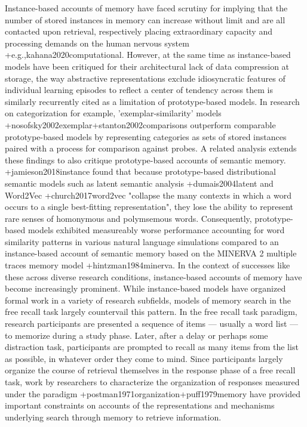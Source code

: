 {}Instance-based accounts of memory have faced scrutiny for implying that the number of stored instances in memory can increase without limit and are all contacted upon retrieval, respectively placing extraordinary capacity and processing demands on the human nervous system +{e.g.,}{}{kahana2020computational}. However, at the same time as instance-based models have been critiqued for their architectural lack of data compression at storage, the way abstractive representations exclude idiosyncratic features of individual learning episodes to reflect a center of tendency across them is similarly recurrently cited as a limitation of prototype-based models. In research on categorization for example, 'exemplar-similarity' models +{}{}{nosofsky2002exemplar}+{}{}{stanton2002comparisons} outperform comparable prototype-based models by representing categories as sets of stored instances paired with a process for comparison against probes. A related analysis extends these findings to also critique prototype-based accounts of semantic memory. +{}{}{jamieson2018instance} found that because prototype-based distributional semantic models such as latent semantic analysis +{}{}{dumais2004latent} and Word2Vec +{}{}{church2017word2vec} "collapse the many contexts in which a word occurs to a single best-fitting representation", they lose the ability to represent rare senses of homonymous and polymsemous words. Consequently, prototype-based models exhibited measureably worse performance accounting for word similarity patterns in various natural language simulations compared to an instance-based account of semantic memory based on the MINERVA 2 multiple traces memory model +{}{}{hintzman1984minerva}. In the context of successes like these across diverse research conditions, instance-based accounts of memory have become increasingly prominent.\markdownRendererInterblockSeparator
{}\markdownRendererInterblockSeparator
{}While instance-based models have organized formal work in a variety of research subfields, models of memory search in the free recall task largely countervail this pattern. In the free recall task paradigm, research participants are presented a sequence of items --- usually a word list --- to memorize during a study phase. Later, after a delay or perhaps some distraction task, participants are prompted to recall as many items from the list as possible, in whatever order they come to mind. Since participants largely organize the course of retrieval themselves in the response phase of a free recall task, work by researchers to characterize the organization of responses measured under the paradigm +{}{}{postman1971organization}+{}{}{puff1979memory} have provided important constraints on accounts of the representations and mechanisms underlying search through memory to retrieve information.\markdownRendererInterblockSeparator
